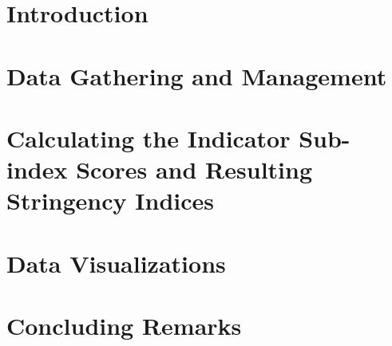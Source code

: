 \documentclass[11pt, a4paper, leqno]{article}
\begin{document}
\tableofcontents
\clearpage



\section*{Introduction} %
\label{sec:introduction}




\section{Data Gathering and Management} %
\label{sec:section1}




\section{Calculating the Indicator Sub-index Scores and Resulting Stringency Indices} %
\label{sec:section2}




\section{Data Visualizations} %
\label{sec:section3}




\section{Concluding Remarks} %
\label{sec:conclusion}




\clearpage





\clearpage

\end{document}
